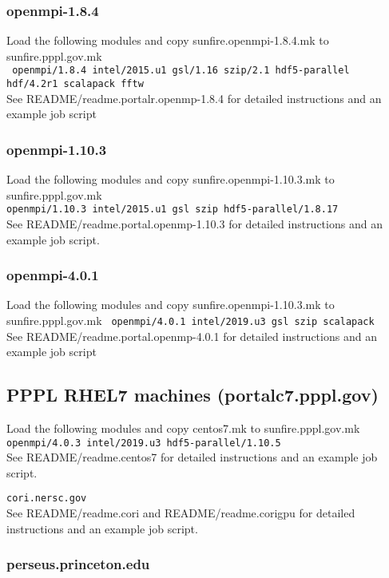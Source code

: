\subsubsection{openmpi-1.8.4}
Load the following modules and copy sunfire.openmpi-1.8.4.mk to sunfire.pppl.gov.mk
\\
\texttt{
openmpi/1.8.4		intel/2015.u1		gsl/1.16			szip/2.1      	hdf5-parallel 
\\
hdf/4.2r1		scalapack		fftw			
}
\\
See README/readme.portalr.openmp-1.8.4 for detailed instructions and an example job script
\subsubsection{openmpi-1.10.3}
Load the following modules and copy sunfire.openmpi-1.10.3.mk to sunfire.pppl.gov.mk
\\
\texttt{openmpi/1.10.3	intel/2015.u1		gsl		szip                     	hdf5-parallel/1.8.17 
}
\\
See README/readme.portal.openmp-1.10.3 for detailed instructions and an example job script.

\subsubsection{openmpi-4.0.1}
Load the following modules and copy sunfire.openmpi-1.10.3.mk to sunfire.pppl.gov.mk
\texttt{
openmpi/4.0.1		intel/2019.u3		gsl		szip                     	scalapack 
}\\
See README/readme.portal.openmp-4.0.1 for detailed instructions and an example job script
\subsection{PPPL RHEL7 machines (portalc7.pppl.gov)}
Load the following modules and copy centos7.mk to sunfire.pppl.gov.mk
\texttt{openmpi/4.0.3		intel/2019.u3		hdf5-parallel/1.10.5 
}\\
See README/readme.centos7 for detailed instructions and an example job script.

\texttt{cori.nersc.gov 
}\\
See README/readme.cori and README/readme.corigpu for detailed instructions and an example job script.

\subsubsection{perseus.princeton.edu}

